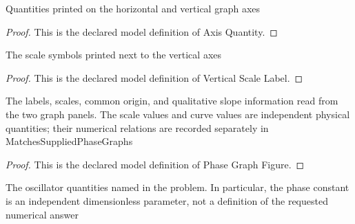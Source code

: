 \begin{definition}
  \label{def:physics:phyx-mini-0254:phyxminiproblems-problemphyxmini0254-axisquantity}
  Quantities printed on the horizontal and vertical graph axes
\end{definition}
\begin{proof}
  This is the declared model definition of Axis Quantity.
\end{proof}
\begin{definition}
  \label{def:physics:phyx-mini-0254:phyxminiproblems-problemphyxmini0254-verticalscalelabel}
  The scale symbols printed next to the vertical axes
\end{definition}
\begin{proof}
  This is the declared model definition of Vertical Scale Label.
\end{proof}
\begin{definition}
  \label{def:physics:phyx-mini-0254:phyxminiproblems-problemphyxmini0254-phasegraphfigure}
  The labels, scales, common origin, and qualitative slope information read from the two graph panels. The scale values and curve values are independent physical quantities; their numerical relations are recorded separately in MatchesSuppliedPhaseGraphs
\end{definition}
\begin{proof}
  This is the declared model definition of Phase Graph Figure.
\end{proof}
\begin{definition}
  \label{def:physics:phyx-mini-0254:phyxminiproblems-problemphyxmini0254-harmonicphasesetup}
  The oscillator quantities named in the problem. In particular, the phase constant is an independent dimensionless parameter, not a definition of the requested numerical answer
\end{definition}

